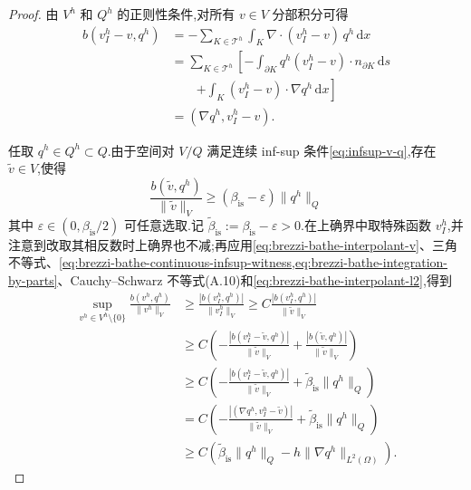 \begin{proof}
由 $V^h$ 和 $Q^h$ 的正则性条件,对所有 $v\in V$ 分部积分可得
\begin{equation}\label{eq:brezzi-bathe-integration-by-parts}
\begin{aligned}
  b(v_I^h-v,q^h)
  &=-\sum_{K\in\mathcal{T}^h}
       \int_K\nabla\cdot(v_I^h-v)\,q^h\,\mathrm{d}x\\
  &=\sum_{K\in\mathcal{T}^h}\left[
       -\int_{\partial K}q^h(v_I^h-v)\cdot n_{\partial K}\,\mathrm{d}s\right.\\
  &\qquad\left.+\int_K(v_I^h-v)\cdot\nabla q^h\,\mathrm{d}x
       \right]\\
  &=(\nabla q^h,v_I^h-v).
\end{aligned}
\end{equation}

任取 $q^h\in Q^h\subset Q$.由于空间对 $V/Q$ 满足连续 inf-sup 条件\cref{eq:infsup-v-q},存在 $\widetilde v\in V$,使得
\begin{equation}\label{eq:brezzi-bathe-continuous-infsup-witness}
  \frac{b(\widetilde v,q^h)}{\|\widetilde v\|_V}
  \ge(\beta_{\mathrm{is}}-\varepsilon)\|q^h\|_Q
\end{equation}
其中 $\varepsilon\in(0,\beta_{\mathrm{is}}/2)$ 可任意选取.记 $\widetilde\beta_{\mathrm{is}}:=\beta_{\mathrm{is}}-\varepsilon>0$.在上确界中取特殊函数 $v_I^h$,并注意到改取其相反数时上确界也不减;再应用\cref{eq:brezzi-bathe-interpolant-v}、三角不等式、\cref{eq:brezzi-bathe-continuous-infsup-witness,eq:brezzi-bathe-integration-by-parts}、Cauchy--Schwarz 不等式(A.10)和\cref{eq:brezzi-bathe-interpolant-l2},得到
\begin{equation}\label{eq:brezzi-bathe-interpolant-sup-estimate}
\begin{aligned}
  \sup_{v^h\in V^h\setminus\{0\}}
    \frac{b(v^h,q^h)}{\|v^h\|_V}
  &\ge
    \frac{|b(v_I^h,q^h)|}{\|v_I^h\|_V}
   \ge C\frac{|b(v_I^h,q^h)|}{\|\widetilde v\|_V}\\
  &\ge C\left(
       -\frac{|b(v_I^h-\widetilde v,q^h)|}{\|\widetilde v\|_V}
       +\frac{|b(\widetilde v,q^h)|}{\|\widetilde v\|_V}
       \right)\\
  &\ge C\left(
       -\frac{|b(v_I^h-\widetilde v,q^h)|}{\|\widetilde v\|_V}
       +\widetilde\beta_{\mathrm{is}}\|q^h\|_Q
       \right)\\
  &=C\left(
       -\frac{|(\nabla q^h,v_I^h-\widetilde v)|}
              {\|\widetilde v\|_V}
       +\widetilde\beta_{\mathrm{is}}\|q^h\|_Q
       \right)\\
  &\ge C\left(
       \widetilde\beta_{\mathrm{is}}\|q^h\|_Q
       -h\|\nabla q^h\|_{L^2(\Omega)}
       \right).
\end{aligned}
\end{equation}


\end{proof}
